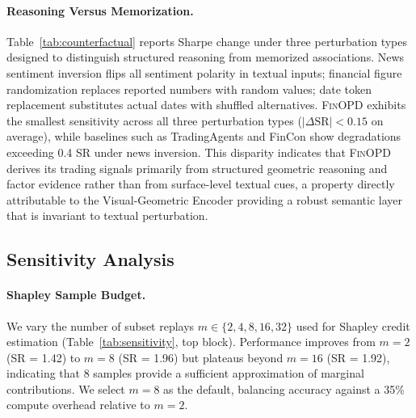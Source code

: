 

\paragraph{Reasoning Versus Memorization.} Table~\ref{tab:counterfactual} reports Sharpe change under three perturbation types designed to distinguish structured reasoning from memorized associations. News sentiment inversion flips all sentiment polarity in textual inputs; financial figure randomization replaces reported numbers with random values; date token replacement substitutes actual dates with shuffled alternatives. \textsc{FinOPD} exhibits the smallest sensitivity across all three perturbation types ($|\Delta\text{SR}| < 0.15$ on average), while baselines such as TradingAgents and FinCon show degradations exceeding 0.4 SR under news inversion. This disparity indicates that \textsc{FinOPD} derives its trading signals primarily from structured geometric reasoning and factor evidence rather than from surface-level textual cues, a property directly attributable to the Visual-Geometric Encoder providing a robust semantic layer that is invariant to textual perturbation.

\subsection{Sensitivity Analysis}



\paragraph{Shapley Sample Budget.} We vary the number of subset replays $m \in \{2, 4, 8, 16, 32\}$ used for Shapley credit estimation (Table~\ref{tab:sensitivity}, top block). Performance improves from $m{=}2$ (SR = 1.42) to $m{=}8$ (SR = 1.96) but plateaus beyond $m{=}16$ (SR = 1.92), indicating that 8 samples provide a sufficient approximation of marginal contributions. We select $m{=}8$ as the default, balancing accuracy against a 35\% compute overhead relative to $m{=}2$.


